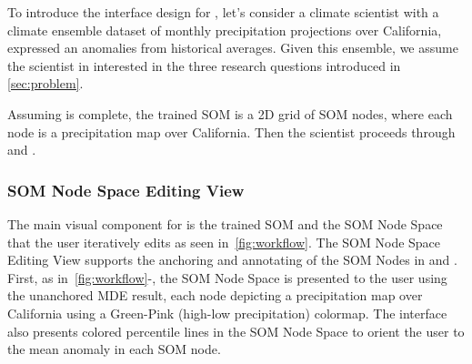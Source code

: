 

To introduce the interface design for \ClimateSOM, let's consider a climate scientist with a climate ensemble dataset of monthly precipitation projections over California, expressed an anomalies from historical averages.
%
Given this ensemble, we assume the scientist in interested in the three research questions introduced in \cref{sec:problem}.

Assuming  is complete, the trained SOM is a 2D grid of SOM nodes, where each node is a precipitation map over California.
%
Then the scientist proceeds through  and .

\subsubsection{SOM Node Space Editing View}
The main visual component for \ClimateSOM is the trained SOM and the SOM Node Space that the user iteratively edits as seen in~\cref{fig:workflow}.
%
The SOM Node Space Editing View supports the anchoring and annotating of the SOM Nodes in  and .
%
First, as in~\cref{fig:workflow}-, the SOM Node Space is presented to the user using the unanchored MDE result, each node depicting a precipitation map over California using a Green-Pink (high-low precipitation) colormap.
%
The interface also presents colored percentile lines in the SOM Node Space to orient the user to the mean anomaly in each SOM node.

